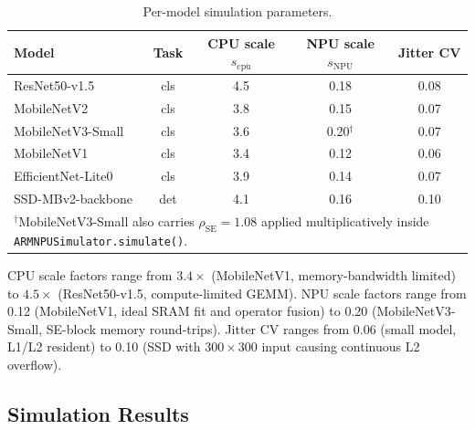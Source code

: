 \begin{table}[H]
\centering
\caption{Per-model simulation parameters.}
\label{tab:m2_per_model_config}
\begin{tabular}{lcccc}
\toprule
\textbf{Model} & \textbf{Task}
    & \textbf{CPU scale $s_{\text{cpu}}$}
    & \textbf{NPU scale $s_{\text{NPU}}$}
    & \textbf{Jitter CV} \\
\midrule
ResNet50-v1.5       & cls & 4.5 & 0.18           & 0.08 \\
MobileNetV2         & cls & 3.8 & 0.15           & 0.07 \\
MobileNetV3-Small   & cls & 3.6 & 0.20$^\dagger$ & 0.07 \\
MobileNetV1         & cls & 3.4 & 0.12           & 0.06 \\
EfficientNet-Lite0  & cls & 3.9 & 0.14           & 0.07 \\
SSD-MBv2-backbone   & det & 4.1 & 0.16           & 0.10 \\
\bottomrule
\multicolumn{5}{p{0.95\textwidth}}{\footnotesize
$^\dagger$MobileNetV3-Small also carries $\rho_{\text{SE}}=1.08$ applied
multiplicatively inside \texttt{ARMNPUSimulator.simulate()}.}
\end{tabular}
\end{table}

CPU scale factors range from $3.4\times$ (MobileNetV1, memory-bandwidth
limited) to $4.5\times$ (ResNet50-v1.5, compute-limited GEMM). NPU scale
factors range from 0.12 (MobileNetV1, ideal SRAM fit and operator fusion) to
0.20 (MobileNetV3-Small, SE-block memory round-trips). Jitter CV ranges from
0.06 (small model, L1/L2 resident) to 0.10 (SSD with $300\times300$ input
causing continuous L2 overflow).

\subsection{Simulation Results}

